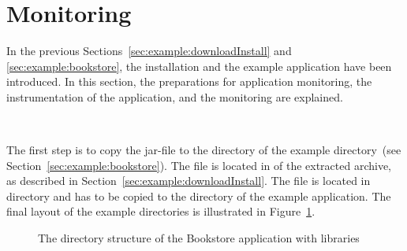 \section{Monitoring}\label{sec:example:monitoring}

In the previous Sections~\ref{sec:example:downloadInstall} and \ref{sec:example:bookstore}, the \Kieker{} installation and the example application have been introduced. In this section, the preparations for application monitoring, the instrumentation of the application, and the monitoring are explained.

\quad\


\noindent The first step is to copy the \Kieker{} jar-file \file{\mainJar} to the  directory of the example directory~(see Section~\ref{sec:example:bookstore}). The file is located in  of the extracted \Kieker{} archive, as described in Section~\ref{sec:example:downloadInstall}. %
The file \file{\commonsLoggingJar} is located in  directory and has to be copied to the  directory of the example application. The final layout of the example directories is illustrated in Figure~\ref{fig:KiekerBookstoreExample}.

\begin{figure}[H]
\begin{graybox}
\end{graybox}
\caption{The directory structure of the Bookstore application with \Kieker{} libraries}
\label{fig:KiekerBookstoreExample}
\end{figure}


